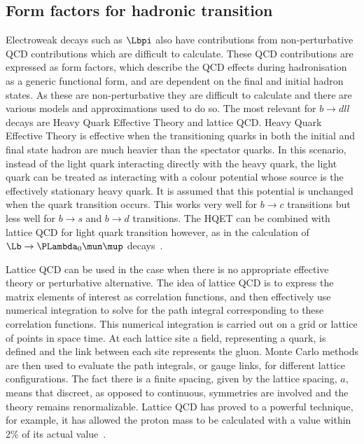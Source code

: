 \subsection{Form factors for hadronic transition}
\label{sec:ff}
Electroweak decays such as $\Lbpi$ also have contributions from non-perturbative QCD contributions which are difficult to calculate. These QCD contributions are expressed as form factors,  which describe the QCD effects during hadronisation as a generic functional form, and are dependent on the final and initial hadron states. As these are non-perturbative they are difficult to calculate and there are various models and approximations used to do so. The most relevant for $b\to dll$ decays are Heavy Quark Effective Theory and lattice QCD. Heavy Quark Effective Theory is effective when the transitioning quarks in both the initial and final state hadron are much heavier than the spectator quarks. In this scenario, instead of the light quark interacting directly with the heavy quark, the light quark can be treated as interacting with a colour potential whose source is the effectively stationary heavy quark. It is assumed that this potential is unchanged when the quark transition occurs. This works very well for $b\to c$ transitions but less well for $b\to s $ and $b\to d$ transitions. The HQET can be combined with lattice QCD for light quark transition however, as in the calculation of $\Lb\to\PLambda_{0}\mun\mup$ decays~\cite{Meinel}.%

Lattice QCD can be used in the case when there is no appropriate effective theory or perturbative alternative. The idea of lattice QCD is to express the matrix elements of interest as correlation functions, and then effectively use numerical integration to solve for the path integral corresponding to these correlation functions. This numerical integration is carried out on a grid or lattice of points in space time. At each lattice site a field, representing a quark, is defined and the link between each site represents the gluon. Monte Carlo methods are then used to evaluate the path integrals, or gauge links, for different lattice configurations. The fact there is a finite spacing, given by the lattice spacing, $a$, means that discreet, as opposed to continuous, symmetries are involved and the theory remains renormalizable. Lattice QCD has proved to a powerful technique, for example,  it has allowed the proton mass to be calculated with a value within 2\% of its actual value~\cite{proton}.



